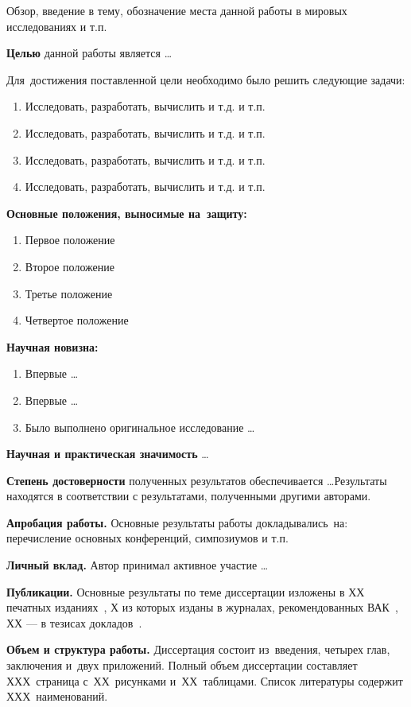 Обзор, введение в тему, обозначение места данной работы в мировых исследованиях и т.п.

\textbf{Целью} данной работы является \ldots

Для~достижения поставленной цели необходимо было решить следующие задачи:
\begin{enumerate}
  \item Исследовать, разработать, вычислить и т.д. и т.п.
  \item Исследовать, разработать, вычислить и т.д. и т.п.
  \item Исследовать, разработать, вычислить и т.д. и т.п.
  \item Исследовать, разработать, вычислить и т.д. и т.п.
\end{enumerate}

\textbf{Основные положения, выносимые на~защиту:}
\begin{enumerate}
  \item Первое положение
  \item Второе положение
  \item Третье положение
  \item Четвертое положение
\end{enumerate}

\textbf{Научная новизна:}
\begin{enumerate}
  \item Впервые \ldots
  \item Впервые \ldots
  \item Было выполнено оригинальное исследование \ldots
\end{enumerate}

\textbf{Научная и практическая значимость} \ldots

\textbf{Степень достоверности} полученных результатов обеспечивается \ldots Результаты находятся в соответствии с результатами, полученными другими авторами.

\textbf{Апробация работы.}
Основные результаты работы докладывались~на:
перечисление основных конференций, симпозиумов и т.п.

\textbf{Личный вклад.} Автор принимал активное участие \ldots

\textbf{Публикации.} Основные результаты по теме диссертации изложены в ХХ печатных изданиях~\cite{bib1,bib2,bib3,bib4,bib5},
Х из которых изданы в журналах, рекомендованных ВАК~\cite{bib1,bib2,bib3}, 
ХХ --- в тезисах докладов~\cite{bib4,bib5}.

\textbf{Объем и структура работы.} Диссертация состоит из~введения, четырех глав, заключения и~двух приложений. Полный объем диссертации составляет ХХХ~страница с~ХХ~рисунками и~ХХ~таблицами. Список литературы содержит ХХХ~наименований.

\clearpage